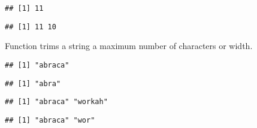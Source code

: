 \documentclass[krantz2]{krantz}\usepackage{knitr}
\begin{document}
\begin{knitrout}\footnotesize
{}\color{fgcolor}\begin{kframe}
\begin{alltt}
\hlstd{(} \hlstd{=} \hlstd{)}
\end{alltt}
\begin{verbatim}
## [1] 11
\end{verbatim}
\begin{alltt}
\hlstd{(} \hlstd{=} \hlstd{(}\hlstd{,} \hlstd{))}
\end{alltt}
\begin{verbatim}
## [1] 11 10
\end{verbatim}
\end{kframe}
\end{knitrout}

Function  trims a string a maximum number of characters or width.

\begin{knitrout}\footnotesize
{}\color{fgcolor}\begin{kframe}
\begin{alltt}
\hlstd{(} \hlstd{=} \hlstd{,}  \hlstd{=} \hlstd{)}
\end{alltt}
\begin{verbatim}
## [1] "abraca"
\end{verbatim}
\begin{alltt}
\hlstd{(} \hlstd{=} \hlstd{,}  \hlstd{=} \hlstd{)}
\end{alltt}
\begin{verbatim}
## [1] "abra"
\end{verbatim}
\begin{alltt}
\hlstd{(} \hlstd{=} \hlstd{(}\hlstd{,} \hlstd{),} \hlstd{)}
\end{alltt}
\begin{verbatim}
## [1] "abraca" "workah"
\end{verbatim}
\begin{alltt}
\hlstd{(} \hlstd{=} \hlstd{(}\hlstd{,} \hlstd{),} \hlstd{(}\hlstd{,} \hlstd{))}
\end{alltt}
\begin{verbatim}
## [1] "abraca" "wor"
\end{verbatim}
\end{kframe}
\end{knitrout}
\end{document}

